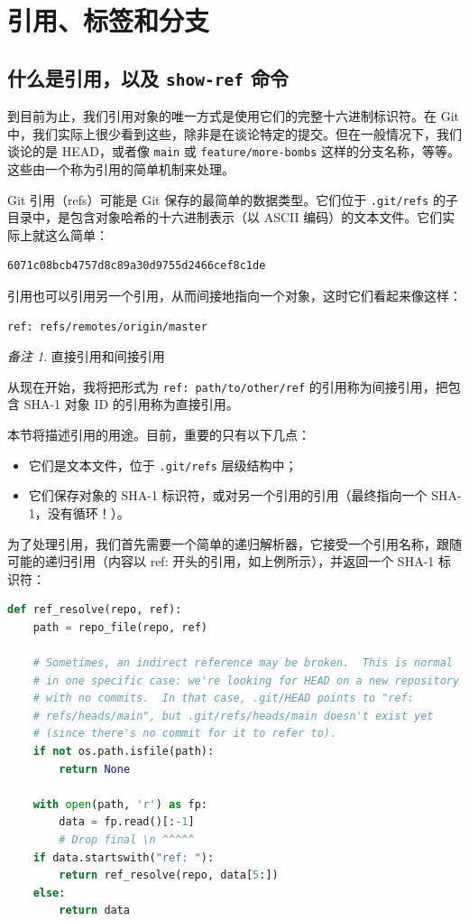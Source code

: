\documentclass{ctexart}
\theoremstyle{remark}
\newtheorem*{remark}{备注}
\theoremstyle{warningstyle}
\theoremstyle{warningstyle}
\begin{document}
\section{引用、标签和分支}
\cprotect\subsection{什么是引用，以及 \verb|show-ref| 命令}
到目前为止，我们引用对象的唯一方式是使用它们的完整十六进制标识符。在 Git 中，我们实际上很少看到这些，除非是在谈论特定的提交。但在一般情况下，我们谈论的是 HEAD，或者像 \lstinline|main| 或 \lstinline|feature/more-bombs| 这样的分支名称，等等。这些由一个称为引用的简单机制来处理。

Git 引用（refs）可能是 Git 保存的最简单的数据类型。它们位于 \lstinline|.git/refs| 的子目录中，是包含对象哈希的十六进制表示（以 ASCII 编码）的文本文件。它们实际上就这么简单：
\begin{lstlisting}[language=bash]
6071c08bcb4757d8c89a30d9755d2466cef8c1de
\end{lstlisting}
引用也可以引用另一个引用，从而间接地指向一个对象，这时它们看起来像这样：
\begin{lstlisting}[language=bash]
ref: refs/remotes/origin/master
\end{lstlisting}
\begin{remark}
直接引用和间接引用

从现在开始，我将把形式为 \lstinline|ref: path/to/other/ref| 的引用称为间接引用，把包含 SHA-1 对象 ID 的引用称为直接引用。
\end{remark}
本节将描述引用的用途。目前，重要的只有以下几点：
\begin{itemize}
    \item 它们是文本文件，位于 \lstinline|.git/refs| 层级结构中；
    \item 它们保存对象的 SHA-1 标识符，或对另一个引用的引用（最终指向一个 SHA-1，没有循环！）。
\end{itemize}
为了处理引用，我们首先需要一个简单的递归解析器，它接受一个引用名称，跟随可能的递归引用（内容以 ref: 开头的引用，如上例所示），并返回一个 SHA-1 标识符：
\begin{lstlisting}[language=Python]
def ref_resolve(repo, ref):
    path = repo_file(repo, ref)

    # Sometimes, an indirect reference may be broken.  This is normal
    # in one specific case: we're looking for HEAD on a new repository
    # with no commits.  In that case, .git/HEAD points to "ref:
    # refs/heads/main", but .git/refs/heads/main doesn't exist yet
    # (since there's no commit for it to refer to).
    if not os.path.isfile(path):
        return None

    with open(path, 'r') as fp:
        data = fp.read()[:-1]
        # Drop final \n ^^^^^
    if data.startswith("ref: "):
        return ref_resolve(repo, data[5:])
    else:
        return data
\end{lstlisting}
\end{document}
